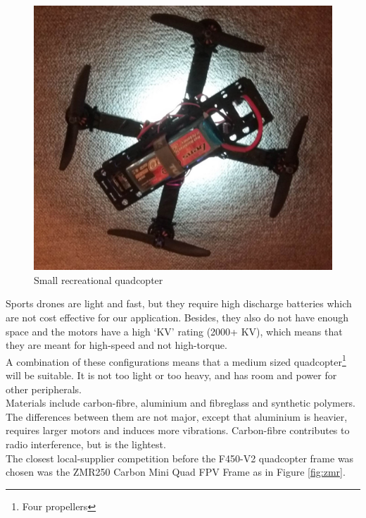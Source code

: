 \begin{figure}[H]
\centering
\includegraphics[scale=0.12]{images/small_quad.jpg}
\caption{Small recreational quadcopter}
\label{fig:small_quad}
\end{figure}

Sports drones are light and fast, but they require high discharge batteries which are not cost effective for our application. Besides, they also do not have enough space and the motors have a high `KV' rating (2000+ KV), which means that they are meant for high-speed and not high-torque.\\

A combination of these configurations means that a medium sized quadcopter\footnote{Four propellers} will be suitable. It is not too light or too heavy, and has room and power for other peripherals.\\

Materials include carbon-fibre, aluminium and fibreglass and synthetic polymers. The differences between them are not major, except that aluminium is heavier, requires larger motors and induces more vibrations. Carbon-fibre contributes to radio interference\cite{frame}, but is the lightest.\\

The closest local-supplier competition before the F450-V2 quadcopter frame was chosen was the ZMR250 Carbon Mini Quad FPV Frame as in Figure \ref{fig:zmr}.

